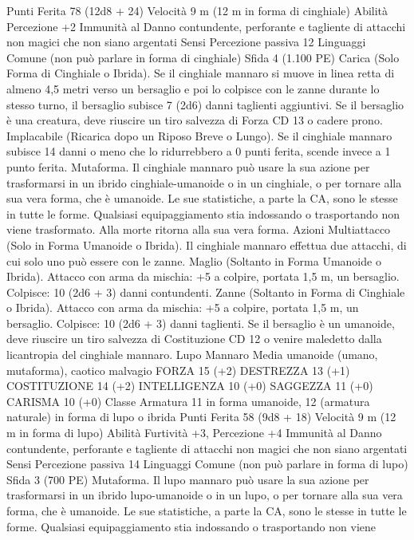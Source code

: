 \begin{multicols}{2}
Punti Ferita 78 (12d8 + 24)
Velocità 9 m (12 m in forma di cinghiale)
Abilità Percezione +2
Immunità al Danno contundente, perforante e tagliente di
attacchi non magici che non siano argentati
Sensi Percezione passiva 12
Linguaggi Comune (non può parlare in forma di cinghiale)
Sfida 4 (1.100 PE)
Carica (Solo Forma di Cinghiale o Ibrida). Se il cinghiale
mannaro si muove in linea retta di almeno 4,5 metri verso un
bersaglio e poi lo colpisce con le zanne durante lo stesso turno, il
bersaglio subisce 7 (2d6) danni taglienti aggiuntivi. Se il
bersaglio è una creatura, deve riuscire un tiro salvezza di Forza
CD 13 o cadere prono.
Implacabile (Ricarica dopo un Riposo Breve o Lungo). Se il
cinghiale mannaro subisce 14 danni o meno che lo ridurrebbero a
0 punti ferita, scende invece a 1 punto ferita.
Mutaforma. Il cinghiale mannaro può usare la sua azione per
trasformarsi in un ibrido cinghiale-umanoide o in un cinghiale, o
per tornare alla sua vera forma, che è umanoide. Le sue
statistiche, a parte la CA, sono le stesse in tutte le forme.
Qualsiasi equipaggiamento stia indossando o trasportando non
viene trasformato. Alla morte ritorna alla sua vera forma.
Azioni
Multiattacco (Solo in Forma Umanoide o Ibrida). Il cinghiale
mannaro effettua due attacchi, di cui solo uno può essere con le
zanne.
Maglio (Soltanto in Forma Umanoide o Ibrida). Attacco con
arma da mischia: +5 a colpire, portata 1,5 m, un bersaglio.
Colpisce: 10 (2d6 + 3) danni contundenti.
Zanne (Soltanto in Forma di Cinghiale o Ibrida). Attacco con
arma da mischia: +5 a colpire, portata 1,5 m, un bersaglio.
Colpisce: 10 (2d6 + 3) danni taglienti. Se il bersaglio è un
umanoide, deve riuscire un tiro salvezza di Costituzione CD 12 o
venire maledetto dalla licantropia del cinghiale mannaro.
Lupo Mannaro
Media umanoide (umano, mutaforma), caotico malvagio
FORZA 15 (+2)
DESTREZZA 13 (+1)
COSTITUZIONE 14 (+2)
INTELLIGENZA 10 (+0)
SAGGEZZA 11 (+0)
CARISMA 10 (+0)
Classe Armatura 11 in forma umanoide, 12 (armatura naturale)
in forma di lupo o ibrida
Punti Ferita 58 (9d8 + 18)
Velocità 9 m (12 m in forma di lupo)
Abilità Furtività +3, Percezione +4
Immunità al Danno contundente, perforante e tagliente di
attacchi non magici che non siano argentati
Sensi Percezione passiva 14
Linguaggi Comune (non può parlare in forma di lupo)
Sfida 3 (700 PE)
Mutaforma. Il lupo mannaro può usare la sua azione per
trasformarsi in un ibrido lupo-umanoide o in un lupo, o per
tornare alla sua vera forma, che è umanoide. Le sue statistiche, a
parte la CA, sono le stesse in tutte le forme. Qualsiasi
equipaggiamento stia indossando o trasportando non viene

\end{multicols}
